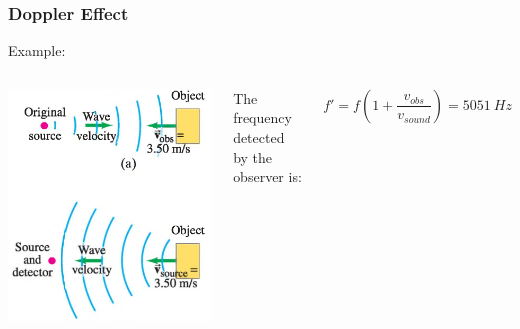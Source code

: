 \documentclass[]{beamer}
\begin{document}

\begin{frame}
\frametitle{Doppler Effect}

Example: 

\vspace{3mm}

   \begin{columns}[c]
   \column{2in}  %
  \begin{center}
  \includegraphics[height=2.in]{images4/doppler7.jpg}
\end{center}


  
   \column{2in}
\pause
The frequency detected by the observer is:

\begin{equation*}
f'= f\left(1+\frac{v_{obs}}{v_{sound}}\right)=5051~Hz
\end{equation*}




   \end{columns}




  \end{frame}


\end{document}
